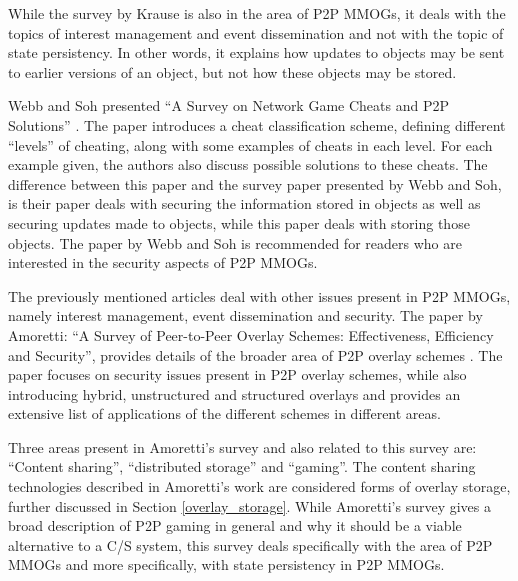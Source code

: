 \documentclass[10pt,a4paper,journal,cspaper,compsoc]{IEEEtran}
\begin{document}
While the survey by Krause is also in the area of P2P MMOGs, it deals with the topics of interest management and event dissemination and not with the
topic of state persistency. In other words, it explains how updates to objects may be sent to earlier versions of an object, but not how these
objects may be stored.

Webb and Soh presented ``A Survey on Network Game Cheats and P2P Solutions'' \cite{survey_p2p_game_cheats}. The paper introduces a cheat
classification scheme, defining different ``levels'' of cheating, along with some examples of cheats in each level. For each example given, the
authors also discuss possible solutions to these cheats. The difference between this paper and the survey paper presented by Webb and Soh, is their
paper deals with securing the information stored in objects as well as securing updates made to objects, while this paper deals with storing those
objects. The paper by Webb and Soh is recommended for readers who are interested in the security aspects of P2P MMOGs.

The previously mentioned articles deal with other issues present in P2P MMOGs, namely interest management, event dissemination and security. The
paper by Amoretti: ``A Survey of Peer-to-Peer Overlay Schemes: Effectiveness, Efficiency and Security'', provides details of the broader area of P2P
overlay schemes \cite{amoretti_p2p_overlay_schemes_survey}. The paper focuses on security issues present in P2P overlay schemes, while also
introducing hybrid, unstructured and structured overlays and provides an extensive list of applications of the different schemes in different areas.

Three areas present in Amoretti's survey and also related to this survey are: ``Content sharing'', ``distributed storage'' and ``gaming''. The
content sharing technologies described in Amoretti's work are considered forms of overlay storage, further discussed in Section
\ref{overlay_storage}. While Amoretti's survey gives a broad description of P2P gaming in general and why it should be a viable alternative to a C/S
system, this survey deals specifically with the area of P2P MMOGs and more specifically, with state persistency in P2P MMOGs.
\end{document}
